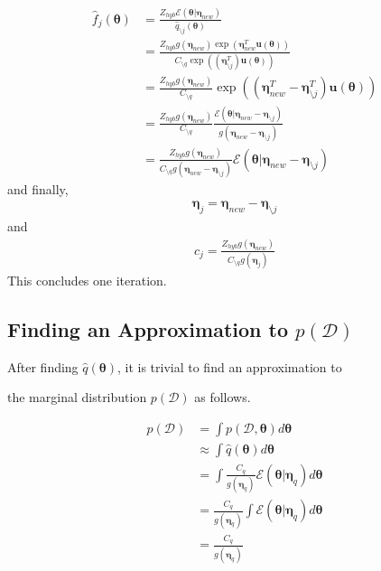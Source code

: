 \documentclass[a4]{article}
\begin{document}
\begin{equation}
\begin{aligned}
\hat{f}_j(\bm{\theta}) &= \frac{Z_{hyb}\mathcal{E}(\bm{\theta}|\bm{\eta}_{new})}
{\hat{q}_{\setminus j}(\bm{\theta})}\\
&= \frac{Z_{hyb}g(\bm{\eta}_{new})\exp(\bm{\eta}_{new}^T\bm{u}(\bm{\theta}))}
{C_{\setminus q}\exp(( \bm{\eta}_{\setminus j}^T)\bm{u}(\bm{\theta}))}\\
&= \frac{Z_{hyb}g(\bm{\eta}_{new})}{C_{\setminus q}}
\exp(( \bm{\eta}_{new}^T - \bm{\eta}_{\setminus j}^T)\bm{u}(\bm{\theta}))\\
&=
\frac{ Z_{hyb}g(\bm{\eta}_{new})}{C_{\setminus q} }
\frac{ \mathcal{E}(\bm{\theta}|\bm{\eta}_{new} - \bm{\eta}_{\setminus j}) }
     { g(\bm{\eta}_{new} - \bm{\eta}_{\setminus j}) }\\
&=
\frac{ Z_{hyb}g(\bm{\eta}_{new}) }
     { C_{\setminus q}g(\bm{\eta}_{new} - \bm{\eta}_{\setminus j}) }
\mathcal{E}(\bm{\theta}|\bm{\eta}_{new} - \bm{\eta}_{\setminus j})\label{eq:update_f_j}
\end{aligned}
\end{equation}
and finally, 
\begin{equation}
\begin{aligned}
\bm{\eta}_j = \bm{\eta}_{new} - \bm{\eta}_{\setminus j}\label{eq:update_eta_j}
\end{aligned}
\end{equation}
and 
\begin{equation}
\begin{aligned}
c_j = \frac{Z_{hyb}g(\bm{\eta}_{new})}{C_{\setminus q}g(\bm{\eta}_{j})}\label{eq:update_C_j}
\end{aligned}
\end{equation}
This concludes one iteration.

\subsection{Finding an Approximation to $p(\mathcal{D})$}

After finding $\hat{q}(\bm{\theta})$, it is trivial to find an approximation to 

the marginal distribution $p(\mathcal{D})$ as follows.

\begin{equation}
\begin{aligned}
p(\mathcal{D}) &= \int p( \mathcal{D}, \bm{\theta}) d\bm{\theta}\\
&\approx \int \hat{q}(\bm{\theta}) d\bm{\theta}\\
&= \int \frac{C_q}{g(\bm{\eta}_q)}\mathcal{E}\left(\bm{\theta}|\bm{\eta}_q\right) d\bm{\theta}\\
&= \frac{C_q}{g(\bm{\eta}_q)}\int \mathcal{E}\left(\bm{\theta}|\bm{\eta}_q\right) d\bm{\theta}\\
&= \frac{C_q}{g(\bm{\eta}_q)}
\end{aligned}
\end{equation}
\end{document}
